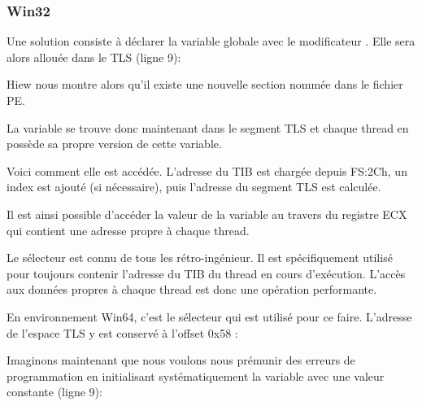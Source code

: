 ﻿\subsubsection{Win32}


Une solution consiste à déclarer la variable globale avec le modificateur .
Elle sera alors allouée dans le \ac{TLS} (ligne 9):



Hiew nous montre alors qu'il existe une nouvelle section nommée  dans le fichier PE.



La variable  se trouve donc maintenant dans le segment \ac{TLS} et chaque thread en
possède sa propre version de cette variable.

Voici comment elle est accédée. L'adresse du \ac{TIB} est chargée depuis FS:2Ch,
un index est ajouté (si nécessaire), puis l'adresse du segment \ac{TLS} est calculée.

Il est ainsi possible d'accéder la valeur de la variable  au travers du registre
ECX qui contient une adresse propre à chaque thread.


Le sélecteur  est connu de tous les rétro-ingénieur. Il est spécifiquement utilisé pour
toujours contenir l'adresse du \ac{TIB} du thread en cours d'exécution. L'accès aux données propres
à chaque thread est donc une opération performante.


En environnement Win64, c'est le sélecteur  qui est utilisé pour ce faire. L'adresse de
l'espace \ac{TLS} y est conservé à l'offset 0x58 :




Imaginons maintenant que nous voulons nous prémunir des erreurs de programmation en initialisant
systématiquement la variable  avec une valeur constante (ligne 9):



